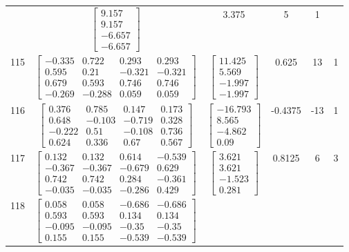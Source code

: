 \documentclass[a4paper,12pt]{article}
\begin{document}
\begin{tabular}{c c c c c c}
&
$\begin{bmatrix} 9.157 \\ 9.157 \\ -6.657 \\ -6.657 \end{bmatrix}$
&
3.375
&
5
&
1
\\
115
&
$\begin{bmatrix} -0.335 & 0.722 & 0.293 & 0.293 \\ 0.595 & 0.21 & -0.321 & -0.321 \\ 0.679 & 0.593 & 0.746 & 0.746 \\ -0.269 & -0.288 & 0.059 & 0.059 \end{bmatrix}$
&
$\begin{bmatrix} 11.425 \\ 5.569 \\ -1.997 \\ -1.997 \end{bmatrix}$
&
0.625
&
13
&
1
\\
116
&
$\begin{bmatrix} 0.376 & 0.785 & 0.147 & 0.173 \\ 0.648 & -0.103 & -0.719 & 0.328 \\ -0.222 & 0.51 & -0.108 & 0.736 \\ 0.624 & 0.336 & 0.67 & 0.567 \end{bmatrix}$
&
$\begin{bmatrix} -16.793 \\ 8.565 \\ -4.862 \\ 0.09 \end{bmatrix}$
&
-0.4375
&
-13
&
1
\\
117
&
$\begin{bmatrix} 0.132 & 0.132 & 0.614 & -0.539 \\ -0.367 & -0.367 & -0.679 & 0.629 \\ 0.742 & 0.742 & 0.284 & -0.361 \\ -0.035 & -0.035 & -0.286 & 0.429 \end{bmatrix}$
&
$\begin{bmatrix} 3.621 \\ 3.621 \\ -1.523 \\ 0.281 \end{bmatrix}$
&
0.8125
&
6
&
3
\\
118
&
$\begin{bmatrix} 0.058 & 0.058 & -0.686 & -0.686 \\ 0.593 & 0.593 & 0.134 & 0.134 \\ -0.095 & -0.095 & -0.35 & -0.35 \\ 0.155 & 0.155 & -0.539 & -0.539 \end{bmatrix}$

\end{tabular}
\end{document}
